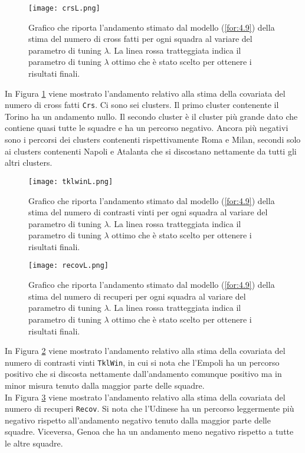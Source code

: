 \begin{figure}[htbp]
	\begin{center}
		\texttt{[image: crsL.png]}
		\caption{Grafico che riporta l'andamento stimato dal modello (\ref{for:4.9}) della stima del numero di cross fatti per ogni squadra al variare del parametro di tuning $\lambda$. La linea rossa tratteggiata indica il parametro di tuning $\lambda$ ottimo che è stato scelto per ottenere i risultati finali.} \label{fig:crsL}
	\end{center}
\end{figure}

In Figura \ref{fig:crsL} viene mostrato l'andamento relativo alla stima della covariata del numero di cross fatti \texttt{Crs}. Ci sono sei clusters. Il primo cluster contenente il Torino ha un andamento nullo. Il secondo cluster è il cluster più grande dato che contiene quasi tutte le squadre e ha un percorso negativo. Ancora più negativi sono i percorsi dei clusters contenenti rispettivamente Roma e Milan, secondi solo ai clusters contenenti Napoli e Atalanta che si discostano nettamente da tutti gli altri clusters.

\begin{figure}[htbp]
	\begin{center}
		\texttt{[image: tklwinL.png]}
		\caption{Grafico che riporta l'andamento stimato dal modello (\ref{for:4.9}) della stima del numero di contrasti vinti per ogni squadra al variare del parametro di tuning $\lambda$. La linea rossa tratteggiata indica il parametro di tuning $\lambda$ ottimo che è stato scelto per ottenere i risultati finali.} \label{fig:tklwinL}
	\end{center}
\end{figure}

\begin{figure}[htbp]
	\begin{center}
		\texttt{[image: recovL.png]}
		\caption{Grafico che riporta l'andamento stimato dal modello (\ref{for:4.9}) della stima del numero di recuperi per ogni squadra al variare del parametro di tuning $\lambda$. La linea rossa tratteggiata indica il parametro di tuning $\lambda$ ottimo che è stato scelto per ottenere i risultati finali.} \label{fig:recovL}
	\end{center}
\end{figure}
In Figura \ref{fig:tklwinL} viene mostrato l'andamento relativo alla stima della covariata del numero di contrasti vinti \texttt{TklWin}, in cui si nota che l'Empoli ha un percorso positivo che si discosta nettamente dall'andamento comunque positivo ma in minor misura tenuto dalla maggior parte delle squadre.\\
In Figura \ref{fig:recovL} viene mostrato l'andamento relativo alla stima della covariata del numero di recuperi \texttt{Recov}. Si nota che l'Udinese ha un percorso leggermente più negativo rispetto all'andamento negativo tenuto dalla maggior parte delle squadre. Viceversa, Genoa che ha un andamento meno negativo rispetto a tutte le altre squadre.\\

